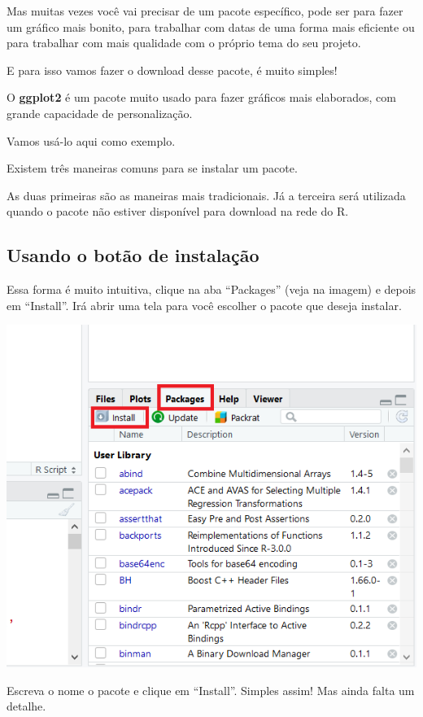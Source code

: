 \documentclass[
]{book}
\begin{document}
Mas muitas vezes você vai precisar de um pacote específico, pode ser
para fazer um gráfico mais bonito, para trabalhar com datas de uma forma
mais eficiente ou para trabalhar com mais qualidade com o próprio tema
do seu projeto.

E para isso vamos fazer o download desse pacote, é muito simples!

O \textbf{ggplot2} é um pacote muito usado para fazer gráficos mais
elaborados, com grande capacidade de personalização.

Vamos usá-lo aqui como exemplo.

Existem três maneiras comuns para se instalar um pacote.

As duas primeiras são as maneiras mais tradicionais. Já a terceira será
utilizada quando o pacote não estiver disponível para download na rede
do R.

\hypertarget{usando-o-botuxe3o-de-instalauxe7uxe3o}{%
\subsection{Usando o botão de
instalação}\label{usando-o-botuxe3o-de-instalauxe7uxe3o}}

Essa forma é muito intuitiva, clique na aba ``Packages'' (veja na
imagem) e depois em ``Install''. Irá abrir uma tela para você escolher o
pacote que deseja instalar.

\includegraphics{imagens/4_pacotes_botao_instalacao.png}

Escreva o nome o pacote e clique em ``Install''. Simples assim! Mas
ainda falta um detalhe.
\end{document}

